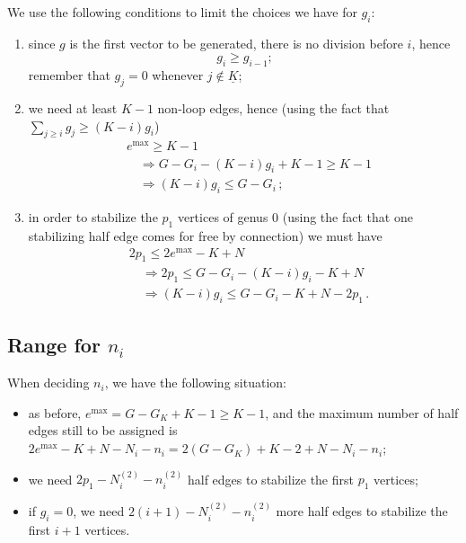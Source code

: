 \documentclass{amsart}
\theoremstyle{plain}
\theoremstyle{definition}
\DeclareMathOperator{\MAX}{max}
\newcommand{\ubar}[1]{\underline{#1}}
\begin{document}
We use the following conditions to limit the choices we have for
$g_i$:
\begin{enumerate}
\item since $g$ is the first vector to be generated, there is no
  division before $i$, hence
  \[
  g_i \geq g_{i-1}\text{;}
  \]
  remember that $g_j = 0$ whenever $j \not\in \ubar{K}$;
\item we need at least $K-1$ non-loop edges, hence (using the fact
  that $\sum_{j \geq i} g_j \geq (K-i) g_i$)
  \begin{align*}
    &e^{\MAX} \geq K-1\\
    &\quad\Rightarrow G - G_i - (K-i) g_i + K-1 \geq K-1\\
    &\quad\Rightarrow (K-i)g_i \leq G - G_i\,\text{;}
  \end{align*}
\item in order to stabilize the $p_1$ vertices of genus $0$ (using the
  fact that one stabilizing half edge comes for free by connection) we
  must have
  \begin{align*}
    &2 p_1 \leq 2e^{\MAX} - K + N\\
    &\quad\Rightarrow 2p_1 \leq G - G_i - (K-i)g_i - K + N\\
    &\quad\Rightarrow (K-i)g_i \leq G - G_i - K + N - 2p_1\,\text{.}
  \end{align*}
\end{enumerate}



\subsection{Range for $n_i$}

When deciding $n_i$, we have the following situation:
\begin{itemize}
\item as before, $e^{\MAX} = G - G_K + K - 1 \geq K-1$, and the
  maximum number of half edges still to be assigned is $2e^{\MAX} - K
  + N - N_i - n_i = 2(G - G_K) + K - 2 + N - N_i - n_i$;
\item we need $2p_1 - N^{(2)}_i - n^{(2)}_i$ half edges to stabilize
  the first $p_1$ vertices;
\item if $g_i = 0$, we need $2(i+1) - N^{(2)}_i - n^{(2)}_i$ more half
  edges to stabilize the first $i+1$ vertices.
\end{itemize}
\end{document}
